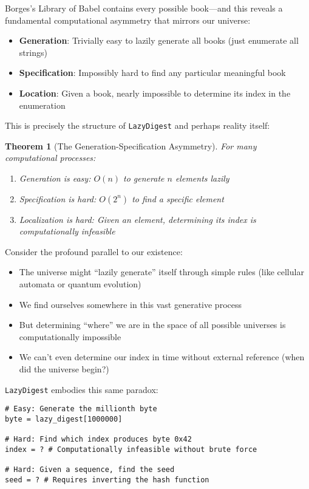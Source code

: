 \documentclass[11pt]{article}
\newtheorem{theorem}{Theorem}
\begin{document}
Borges's Library of Babel contains every possible book---and this reveals a fundamental computational asymmetry that mirrors our universe:

\begin{itemize}
\item \textbf{Generation}: Trivially easy to lazily generate all books (just enumerate all strings)
\item \textbf{Specification}: Impossibly hard to find any particular meaningful book
\item \textbf{Location}: Given a book, nearly impossible to determine its index in the enumeration
\end{itemize}

This is precisely the structure of \texttt{LazyDigest} and perhaps reality itself:

\begin{theorem}[The Generation-Specification Asymmetry]
For many computational processes:
\begin{enumerate}
\item Generation is easy: $O(n)$ to generate $n$ elements lazily
\item Specification is hard: $O(2^n)$ to find a specific element
\item Localization is hard: Given an element, determining its index is computationally infeasible
\end{enumerate}
\end{theorem}

Consider the profound parallel to our existence:
\begin{itemize}
\item The universe might ``lazily generate'' itself through simple rules (like cellular automata or quantum evolution)
\item We find ourselves somewhere in this vast generative process
\item But determining ``where'' we are in the space of all possible universes is computationally impossible
\item We can't even determine our index in time without external reference (when did the universe begin?)
\end{itemize}

\texttt{LazyDigest} embodies this same paradox:
\begin{lstlisting}
# Easy: Generate the millionth byte
byte = lazy_digest[1000000]

# Hard: Find which index produces byte 0x42
index = ? # Computationally infeasible without brute force

# Hard: Given a sequence, find the seed
seed = ? # Requires inverting the hash function
\end{lstlisting}
\end{document}
